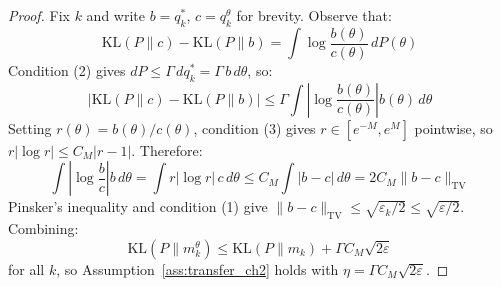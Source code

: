     \begin{proof}
    Fix $k$ and write $b = q^*_k$, $c = q^\theta_k$ for brevity. Observe that:
    \begin{equation}
        \mathrm{KL}(P \| c) - \mathrm{KL}(P \| b) = \int \log \frac{b(\theta)}{c(\theta)}\, dP(\theta)
    \end{equation}
    Condition (2) gives $dP \leq \Gamma\, dq^*_k = \Gamma\, b\, d\theta$, so:
    \begin{equation}
        \left|\mathrm{KL}(P \| c) - \mathrm{KL}(P \| b)\right| \leq \Gamma \int \left|\log \frac{b(\theta)}{c(\theta)}\right| b(\theta)\, d\theta
    \end{equation}
    Setting $r(\theta) = b(\theta)/c(\theta)$, condition (3) gives $r \in [e^{-M}, e^M]$ pointwise, so $r|\log r| \leq C_M|r-1|$. Therefore:
    \begin{equation}
        \int \left|\log \frac{b}{c}\right| b\, d\theta = \int r|\log r|\, c\, d\theta \leq C_M \int |b - c|\, d\theta = 2C_M \|b - c\|_\mathrm{TV}
    \end{equation}
    Pinsker's inequality and condition (1) give $\|b - c\|_\mathrm{TV} \leq \sqrt{\varepsilon_k / 2} \leq \sqrt{\varepsilon / 2}$. Combining:
    \begin{equation}
        \mathrm{KL}(P \| m^\theta_k) \leq \mathrm{KL}(P \| m_k) + \Gamma C_M \sqrt{2\varepsilon}
    \end{equation}
    for all $k$, so Assumption~\ref{ass:transfer_ch2} holds with $\eta = \Gamma C_M \sqrt{2\varepsilon}$.
    \end{proof}